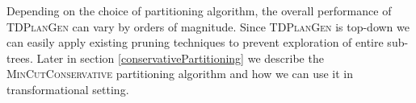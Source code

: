 Depending on the choice of partitioning algorithm, the overall performance of \textsc{TDPlanGen} can vary by orders of magnitude. Since \textsc{TDPlanGen} is top-down  we can easily apply existing pruning techniques to prevent exploration of entire sub-trees. Later in section \ref{conservativePartitioning} we describe the \textsc{MinCutConservative} partitioning algorithm and how we can use it in transformational setting. 